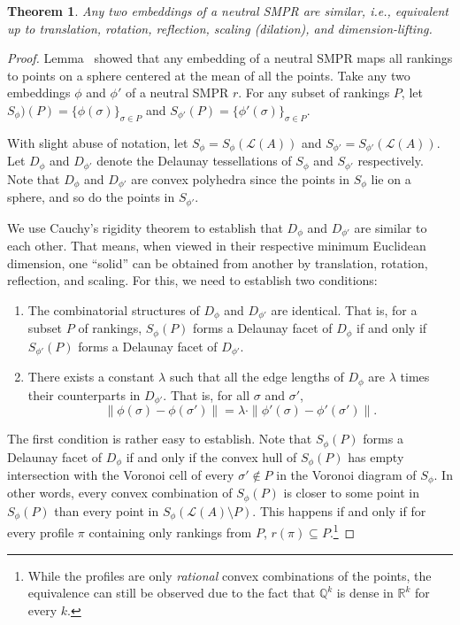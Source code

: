 \documentclass[10pt,letterpaper]{article}
\newcommand{\calL}{{\mathcal{L}}}
\newcommand{\rank}{{\calL(A)}}
\newtheorem{theorem}{Theorem}
\begin{document}
\begin{theorem}
Any two embeddings of a neutral SMPR are similar, i.e., equivalent up to translation, rotation, reflection, scaling (dilation), and dimension-lifting. 
\end{theorem}
\begin{proof}
Lemma~\cite{BLAH} showed that any embedding of a neutral SMPR maps all rankings to points on a sphere centered at the mean of all the points. Take any two embeddings $\phi$ and $\phi'$ of a neutral SMPR $r$. For any subset of rankings $P$, let $S_{\phi})(P) = \{\phi(\sigma)\}_{\sigma \in P}$ and $S_{\phi'}(P) = \{\phi'(\sigma)\}_{\sigma \in P}$. 

With slight abuse of notation, let $S_{\phi} = S_{\phi}(\rank)$ and $S_{\phi'} = S_{\phi'}(\rank)$. Let $D_{\phi}$ and $D_{\phi'}$ denote the Delaunay tessellations of $S_{\phi}$ and $S_{\phi'}$ respectively. Note that $D_{\phi}$ and $D_{\phi'}$ are convex polyhedra since the points in $S_{\phi}$ lie on a sphere, and so do the points in $S_{\phi'}$.

We use Cauchy's rigidity theorem to establish that $D_{\phi}$ and $D_{\phi'}$ are similar to each other. That means, when viewed in their respective minimum Euclidean dimension, one ``solid'' can be obtained from another by translation, rotation, reflection, and scaling. For this, we need to establish two conditions:
\begin{enumerate}
\item The combinatorial structures of $D_{\phi}$ and $D_{\phi'}$ are identical. That is, for a subset $P$ of rankings, $S_{\phi}(P)$ forms a Delaunay facet of $D_{\phi}$ if and only if $S_{\phi'}(P)$ forms a Delaunay facet of $D_{\phi'}$.
\item There exists a constant $\lambda$ such that all the edge lengths of $D_{\phi}$ are $\lambda$ times their counterparts in $D_{\phi'}$. That is, for all $\sigma$ and $\sigma'$,
$$
\|\phi(\sigma)-\phi(\sigma')\| = \lambda \cdot \|\phi'(\sigma)-\phi'(\sigma')\|.
$$
\end{enumerate}

The first condition is rather easy to establish. Note that $S_{\phi}(P)$ forms a Delaunay facet of $D_{\phi}$ if and only if the convex hull of $S_{\phi}(P)$ has empty intersection with the Voronoi cell of every $\sigma' \notin P$ in the Voronoi diagram of $S_{\phi}$. In other words, every convex combination of $S_{\phi}(P)$ is closer to some point in $S_{\phi}(P)$ than every point in $S_{\phi}(\rank\setminus P)$. This happens if and only if for every profile $\pi$ containing only rankings from $P$, $r(\pi) \subseteq P$.\footnote{While the profiles are only \emph{rational} convex combinations of the points, the equivalence can still be observed due to the fact that $\mathbb{Q}^k$ is dense in $\mathbb{R}^k$ for every $k$.}


\end{proof}
\end{document}
